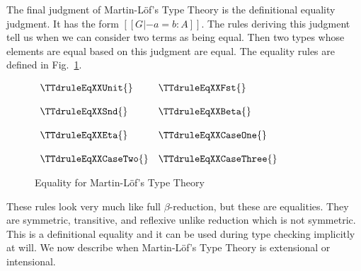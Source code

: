 The final judgment of Martin-L\"of's Type Theory is the definitional
equality judgment. It has the form $[[G |- a = b : A]]$. The rules
deriving this judgment tell us when we can consider two terms as being
equal.  Then two types whose elements are equal based on this judgment
are equal.  The equality rules are defined in Fig.~\ref{fig:lof_eq}.
\begin{figure}
  \begin{center}
    \begin{math}
      \begin{array}{lll}
        \TTdruleEqXXUnit{} & \TTdruleEqXXFst{}\\
        &\\
        \TTdruleEqXXSnd{} & \TTdruleEqXXBeta{}\\
        &\\
        \TTdruleEqXXEta{} & \TTdruleEqXXCaseOne{}\\
        &\\
        \TTdruleEqXXCaseTwo{} & \TTdruleEqXXCaseThree{}
      \end{array}
    \end{math}
  \end{center}
  \caption{Equality for Martin-L\"of's Type Theory}
  \label{fig:lof_eq}
\end{figure}
These rules look very much like full $\beta$-reduction, but these are
equalities.  They are symmetric, transitive, and reflexive unlike
reduction which is not symmetric.  This is a definitional equality and
it can be used during type checking implicitly at will.  We now
describe when Martin-L\"of's Type Theory is extensional or intensional.


